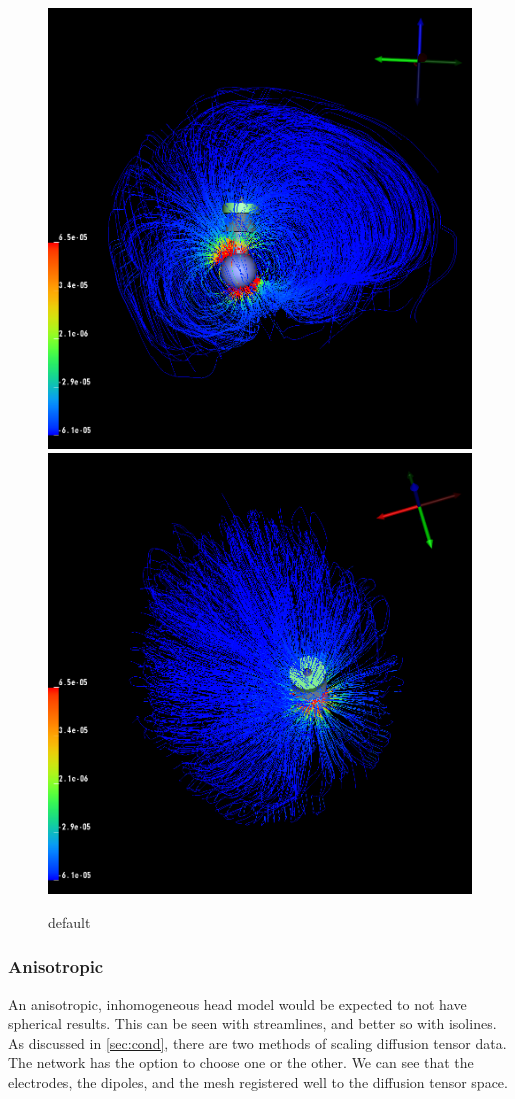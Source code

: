 \begin{figure}[H]
\begin{center}
\includegraphics[width=.49\textwidth]{Figures/iso_streamlines}
\includegraphics[width=.49\textwidth]{Figures/iso_streamlines_top}
\caption{default}
\label{default}
\end{center}
\end{figure}

\subsubsection{Anisotropic}

An anisotropic, inhomogeneous head model would be expected to not have spherical results. This can be seen with streamlines, and better so with isolines. As discussed in \ref{sec:cond}, there are two methods of scaling diffusion tensor data. The network has the option to choose one or the other. We can see that the electrodes, the dipoles, and the mesh registered well to the diffusion tensor space.

